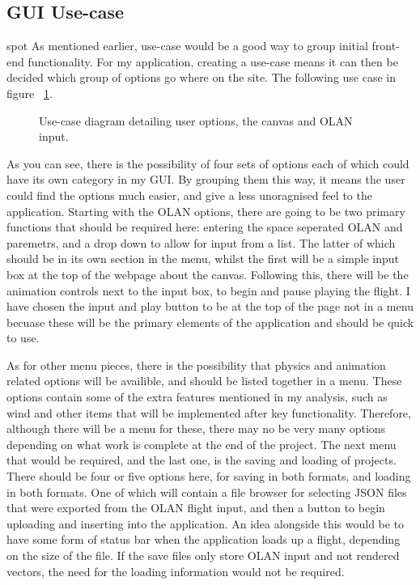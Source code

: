 \subsection{GUI Use-case}spot
As mentioned earlier, use-case would be a good way to group initial front-end functionality. For my application, creating a use-case means it can then be decided which group of options go where on the site. The following use case in figure ~\ref{fig:usecase}.

\begin{figure}[h!]
  \centering
  \caption{Use-case diagram detailing user options, the canvas and OLAN input.}
  \label{fig:usecase}
\end{figure}

As you can see, there is the possibility of four sets of options each of which could have its own category in my GUI. By grouping them this way, it means the user could find the options much easier, and give a less unoragnised feel to the application. Starting with the OLAN options, there are going to be two primary functions that should be required here: entering the space seperated OLAN and paremetrs, and a drop down to allow for input from a list. The latter of which should be in its own section in the menu, whilst the first will be a simple input box at the top of the webpage about the canvas. Following this, there will be the animation controls next to the input box, to begin and pause playing the flight. I have chosen the input and play button to be at the top of the page not in a menu becuase these will be the primary elements of the application and should be quick to use.

As for other menu pieces, there is the possibility that physics and animation related options will be availible, and should be listed together in a menu. These options contain some of the extra features mentioned in my analysis, such as wind and other items that will be implemented after key functionality. Therefore, although there will be a menu for these, there may no be very many options depending on what work is complete at the end of the project. The next menu that would be required, and the last one, is the saving and loading of projects. There should be four or five options here, for saving in both formats, and loading in both formats. One of which will contain a file browser for selecting JSON files that were exported from the OLAN flight input, and then a button to begin uploading and inserting into the application. An idea alongside this would be to have some form of status bar when the application loads up a flight, depending on the size of the file. If the save files only store OLAN input and not rendered vectors, the need for the loading information would not be required.

